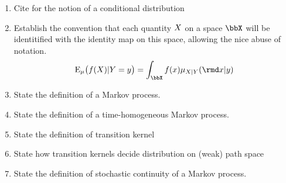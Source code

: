 \begin{enumerate}
  \item
    Cite \cite{kallenberg2002} for the notion of a conditional distribution
  \item
    Establish the convention that each quantity $X$ on a space $\stateSpace$ will be identitified with the identity map on this space, allowing the nice abuse of notation.
    \[
      \Exp_\mu\big( f(\X) | Y = y \big) = \int_\stateSpace f(\stateVar) \mu_{\X|Y}(\rmd\stateVar | y)
    \]
  \item
    State the definition of a Markov process.
  \item
    State the definition of a time-homogeneous Markov process.
  \item
    State the definition of transition kernel
  \item
    State how transition kernels decide distribution on (weak) path space
  \item
    State the definition of stochastic continuity of a Markov process.
\end{enumerate}
